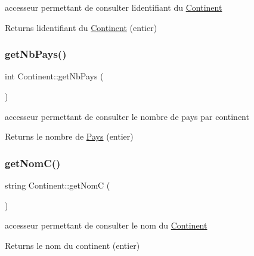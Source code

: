 accesseur permettant de consulter l\textquotesingle{}identifiant du \mbox{\hyperlink{classContinent}{Continent}} 

\begin{DoxyReturn}{Returns}
l\textquotesingle{}identifiant du \mbox{\hyperlink{classContinent}{Continent}} (entier) 
\end{DoxyReturn}
\mbox{\label{classContinent_a6d99d10cf3d36c4b59b691f4ea46a07f}} 
\subsubsection{\texorpdfstring{get\+Nb\+Pays()}{getNbPays()}}
{\footnotesize\ttfamily int Continent\+::get\+Nb\+Pays (\begin{DoxyParamCaption}{ }\end{DoxyParamCaption})}



accesseur permettant de consulter le nombre de pays par continent 

\begin{DoxyReturn}{Returns}
le nombre de \mbox{\hyperlink{classPays}{Pays}} (entier) 
\end{DoxyReturn}
\mbox{\label{classContinent_adf0ef7f12c574679b260163e96cdd410}} 
\subsubsection{\texorpdfstring{get\+Nom\+C()}{getNomC()}}
{\footnotesize\ttfamily string Continent\+::get\+NomC (\begin{DoxyParamCaption}{ }\end{DoxyParamCaption})}



accesseur permettant de consulter le nom du \mbox{\hyperlink{classContinent}{Continent}} 

\begin{DoxyReturn}{Returns}
le nom du continent (entier) 
\end{DoxyReturn}
\mbox{\label{classContinent_a18597ac399b96c6e8b31a2e26f202a74}} 
